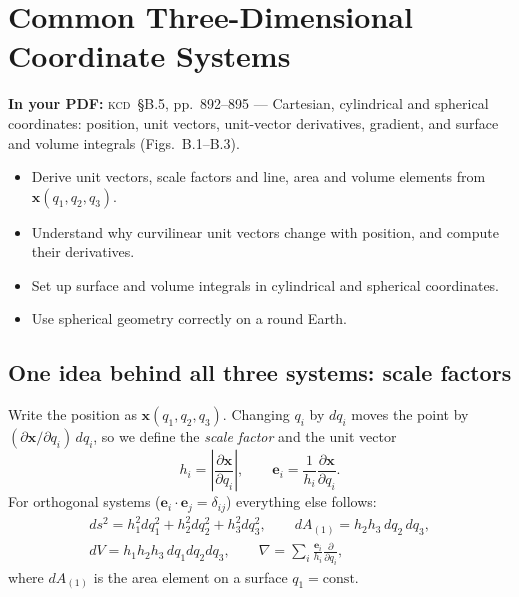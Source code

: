 \documentclass[11pt,letterpaper]{article}
\numberwithin{equation}{section}
\newcommand{\xx}{\mathbf{x}}
\newcommand{\e}[1]{\mathbf{e}_{#1}}
\newcommand{\pd}[2]{\frac{\partial #1}{\partial #2}}
\newcommand{\Kundu}{\textnormal{\textsc{kcd}}}   %
\begin{document}
\clearpage
\section{Common Three-Dimensional Coordinate Systems}\label{sec:B5}
\begin{source}
\textbf{In your PDF:} \Kundu\ \S B.5, pp.~892--895 --- Cartesian, cylindrical and spherical coordinates: position, unit
vectors, unit-vector derivatives, gradient, and surface and volume integrals (Figs.~B.1--B.3).
\end{source}

\begin{goals}
\begin{itemize}
  \item Derive unit vectors, scale factors and line, area and volume elements from $\xx(q_1,q_2,q_3)$.
  \item Understand why curvilinear unit vectors change with position, and compute their derivatives.
  \item Set up surface and volume integrals in cylindrical and spherical coordinates.
  \item Use spherical geometry correctly on a round Earth.
\end{itemize}
\end{goals}

\subsection{One idea behind all three systems: scale factors}
Write the position as $\xx(q_1,q_2,q_3)$. Changing $q_i$ by $dq_i$ moves the point by $(\partial\xx/\partial q_i)\,dq_i$, so
we define the \emph{scale factor} and the unit vector
\begin{equation}\label{eq:scalefactor}
h_i=\left|\pd{\xx}{q_i}\right|,\qquad \e{i}=\frac{1}{h_i}\pd{\xx}{q_i}.
\end{equation}
For orthogonal systems ($\e{i}\cdot\e{j}=\delta_{ij}$) everything else follows:
\begin{equation}\label{eq:elements}
\begin{gathered}
ds^2=h_1^2dq_1^2+h_2^2dq_2^2+h_3^2dq_3^2,\qquad dA_{(1)}=h_2h_3\,dq_2\,dq_3,\\
dV=h_1h_2h_3\,dq_1dq_2dq_3,\qquad \nabla=\sum_i\frac{\e{i}}{h_i}\pd{}{q_i},
\end{gathered}
\end{equation}
where $dA_{(1)}$ is the area element on a surface $q_1=\text{const}$.
\end{document}
